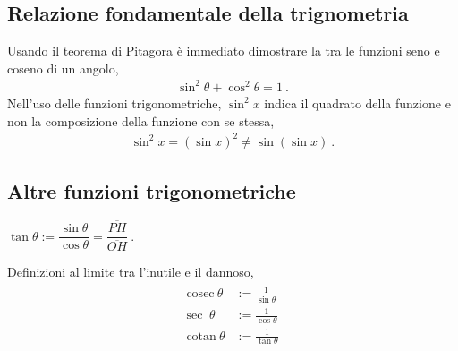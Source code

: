 \documentclass[letterpaper,10pt,english]{jupyterBook}
\begin{document}
\subsection{Relazione fondamentale della trignometria}
\label{\detokenize{ch/trigonometry:relazione-fondamentale-della-trignometria}}
\sphinxAtStartPar
Usando il teorema di Pitagora è immediato dimostrare la  tra le funzioni seno e coseno di un angolo,
\begin{equation*}
\begin{split}\sin^2 \theta + \cos^2 \theta = 1 \ .\end{split}
\end{equation*}
\sphinxAtStartPar
{} Nell’uso delle funzioni trigonometriche, \(\sin^2 x\) indica il quadrato della funzione e non la composizione della funzione con se stessa,
\begin{equation*}
\begin{split}\sin^2 x = (\sin x)^2 \neq \sin( \sin x) \ .\end{split}
\end{equation*}

\subsection{Altre funzioni trigonometriche}
\label{\detokenize{ch/trigonometry:altre-funzioni-trigonometriche}}
\sphinxAtStartPar
{} \(\tan \theta := \dfrac{\sin \theta}{\cos \theta} = \dfrac{\overline{PH}}{\overline{OH}} \ .\)

\sphinxAtStartPar
{} Definizioni al limite tra l’inutile e il dannoso,
\begin{equation*}
\begin{split}\begin{aligned}
  \text{cosec} \ \theta & := \frac{1}{\sin \theta} \\
  \text{sec  } \ \theta & := \frac{1}{\cos \theta} \\
  \text{cotan} \ \theta & := \frac{1}{\tan \theta} \\
\end{aligned}\end{split}
\end{equation*}
\end{document}

